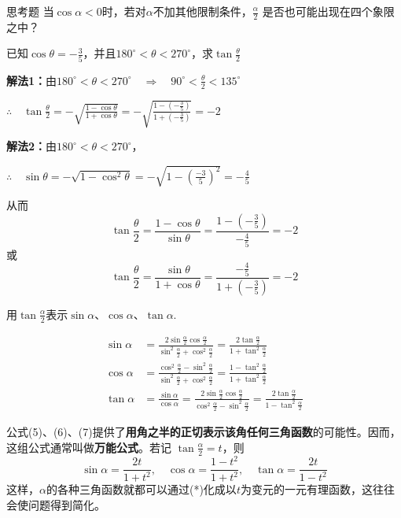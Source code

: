 \begin{thm}{思考题}
当$\cos\alpha<0$时，若对$\alpha$不加其他限制条件，$\frac{\alpha}{2}$
是否也可能出现在四个象限之中？
\end{thm}

\begin{example}
已知$\cos\theta=-\frac{3}{5}$，并且$180^{\circ}<\theta<270^{\circ}$，求$\tan\frac{\theta}{2}$
\end{example}

\begin{solution}
\textbf{解法1：}由$180^{\circ}<\theta<270^{\circ}\quad \Rightarrow\quad 90^{\circ}<\frac{\theta}{2}<135^{\circ}$

$\therefore\quad \tan\frac{\theta}{2}=-\sqrt{\frac{1-\cos\theta}{1+\cos\theta}}=-\sqrt{\frac{1-\left(-\frac{3}{5}\right)}{1+\left(-\frac{3}{5}\right)}}=-2$

\textbf{解法2：}由$180^{\circ}<\theta<270^{\circ}$，

$\therefore\quad \sin\theta=-\sqrt{1-\cos^2\theta}=-\sqrt{1-\left(\frac{-3}{5}\right)^2}=-\frac{4}{5}$

从而
\[\tan\frac{\theta}{2}=\frac{1-\cos\theta}{\sin\theta}=\frac{1-\left(-\frac{3}{5}\right)}{-\frac{4}{5}}=-2\]
或
\[\tan\frac{\theta}{2}=\frac{\sin\theta}{1+\cos\theta}=\frac{-\frac{4}{5}}{1+\left(-\frac{3}{5}\right)}=-2\]
\end{solution}

\begin{example}
用$\tan\frac{\alpha}{2}$表示$\sin\alpha$、$\cos\alpha$、$\tan\alpha$. 
\end{example}

\begin{solution}
\begin{align}
\sin\alpha&=\frac{2\sin\frac{\alpha}{2}\cos\frac{\alpha}{2}}{\sin^2\frac{\alpha}{2}+\cos^2\frac{\alpha}{2}}=\frac{2\tan\frac{\alpha}{2}}{1+\tan^2\frac{\alpha}{2}} \tag{5}\\
\cos\alpha&=\frac{\cos^2\frac{\alpha}{2}-\sin^2\frac{\alpha}{2}}{\sin^2\frac{\alpha}{2}+\cos^2\frac{\alpha}{2}}=\frac{1-\tan^2\frac{\alpha}{2}}{1+\tan^2\frac{\alpha}{2}} \tag{6}\\
\tan\alpha&=\frac{\sin\alpha}{\cos\alpha}=\frac{2\sin\frac{\alpha}{2}\cos\frac{\alpha}{2}}{\cos^2\frac{\alpha}{2}-\sin^2\frac{\alpha}{2}}=\frac{2\tan\frac{\alpha}{2}}{1-\tan^2\frac{\alpha}{2}} \tag{7}
\end{align}
\end{solution}

公式(5)、(6)、(7)提供了\textbf{用角之半的正切表示该角任何三角函数}的可能性。因而，这组公式通常叫做\textbf{万能公式}。若记
$\tan\frac{\alpha}{2}=t$，则
\begin{equation}
\sin\alpha=\frac{2t}{1+t^2},\quad \cos\alpha=\frac{1-t^2}{1+t^2},\quad \tan\alpha=\frac{2t}{1-t^2}\tag{*}
\end{equation}
这样，$\alpha$的各种三角函数就都可以通过(*)化成以$t$为变元的一元有理函数，这往往会使问题得到简化。

